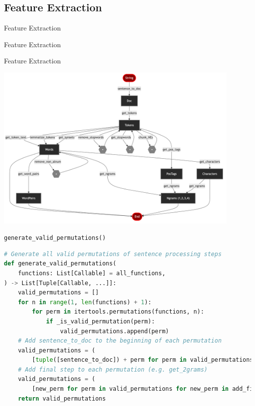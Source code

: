 \documentclass{beamer}
\begin{document}
\subsection{Feature Extraction}
\begin{frame}{Feature Extraction}
    \begin{center}
        \Large Feature Extraction
    \end{center}
\end{frame}

\begin{frame}{Feature Extraction}
    \begin{center}
        \includegraphics[width=0.9\textwidth]{figures/mermaid/permutations.md-1.png}
    \end{center}
\end{frame}

\begin{frame}[fragile]{\texttt{generate\_valid\_permutations()}}
    \begin{lstlisting}[language=Python]
# Generate all valid permutations of sentence processing steps
def generate_valid_permutations(
    functions: List[Callable] = all_functions,
) -> List[Tuple[Callable, ...]]:
    valid_permutations = []
    for n in range(1, len(functions) + 1):
        for perm in itertools.permutations(functions, n):
            if _is_valid_permutation(perm):
                valid_permutations.append(perm)
    # Add sentence_to_doc to the beginning of each permutation
    valid_permutations = (
        [tuple([sentence_to_doc]) + perm for perm in valid_permutations])
    # Add final step to each permutation (e.g. get_2grams)
    valid_permutations = (
        [new_perm for perm in valid_permutations for new_perm in add_final_step(perm)])
    return valid_permutations

    \end{lstlisting}
\end{frame}
\end{document}
